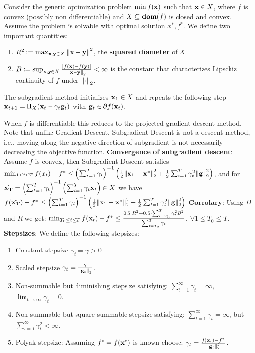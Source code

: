 Consider the generic optimization problem $\min f(\mathbf{x})$ such that $\mathbf{x} \in X$, where $f$ is convex (possibly non differentiable) and $X \subseteq \textbf{dom}(f)$ is closed and convex. Assume the problem is solvable with optimal solution $x^*, f^*$. We define two important quantities:
\begin{enumerate}[label=(\roman*), topsep=0pt,itemsep=0ex,partopsep=0ex,parsep=0ex]
    \itemsep0em
    \item $R^2 := \max_{\mathbf{x}, \mathbf{y} \in X}{\norm{\mathbf{x} - \mathbf{y}}^2}$, the \textbf{squared diameter} of $X$
    \item $B := \sup_{\mathbf{x}, \mathbf{y} \in X}{\frac{\abs{f(\mathbf{x}) - f(\mathbf{y})}}{\norm{\mathbf{x} - \mathbf{y}}_2}} < \infty$ is the constant that characterizes Lipschiz continuity of $f$ under $\norm{\cdot}_2$.
\end{enumerate}
\begin{framed}
    The subgradient method initializes $\mathbf{x}_1 \in X$ and repeats the following step $\mathbf{x}_{t+1}= \Pi_X(\mathbf{x}_t - \gamma_t \mathbf{g}_t)$ with $\mathbf{g}_t \in \partial f(\mathbf{x}_t)$.
\end{framed}
When $f$ is differentiable this reduces to the projected gradient descent method. Note that unlike Gradient Descent, Subgradient Descent is not a descent method, i.e., moving along the negative direction of subgradient is not necessarily decreasing the objective function.
\textbf{Convergence of subgradient descent}: Assume $f$ is convex, then Subgradient Descent satisfies $\min_{1 \leq t \leq T}{f(x_t) - f^*} \leq \left(\sum_{t=1}^T{\gamma_t}\right)^{-1}\left(\frac{1}{2}\norm{\mathbf{x}_1 - \mathbf{x}^*}_2^2 +\frac{1}{2}\sum_{t=1}^T{\gamma_t^2 \norm{\mathbf{g}}_2^2} \right)$, and for $\hat{\mathbf{x}_T} = \left(\sum_{t=1}^T{\gamma_t} \right)^{-1} \left(\sum_{t=1}^T \gamma_t \mathbf{x}_t \right) \in X$ we have $f(\hat{\mathbf{x}_T}) - f^* \leq \left(\sum_{t=1}^T{\gamma_t}\right)^{-1}\left(\frac{1}{2}\norm{\mathbf{x}_1 - \mathbf{x}^*}_2^2 +\frac{1}{2}\sum_{t=1}^T{\gamma_t^2 \norm{\mathbf{g}}_2^2} \right)$
\textbf{Corrolary}: Using $B$ and $R$ we get: $\min_{T_0 \leq t \leq T}{f(\mathbf{x}_t) - f^*} \leq \frac{0.5 \cdot R^2 + 0.5 \cdot \sum_{t=T_0}^T{\gamma_t^2 B^2}}{\sum_{t=T_0}^T{\gamma_t}}$, $\forall 1 \leq T_0 \leq T$. \\
\textbf{Stepsizes}: We define the following stepsizes:
\begin{enumerate}[label=(\roman*), topsep=0pt,itemsep=0ex,partopsep=0ex,parsep=0ex]    
    \itemsep0em
    \item Constant stepsize $\gamma_t = \gamma > 0$
    \item Scaled stepsize $\gamma_t = \frac{\gamma}{\norm{\mathbf{g}_t}_2}$.
    \item Non-summable but diminishing stepsize satisfying: $\sum_{t=1}^{\infty}{\gamma_t} = \infty$, $\lim_{t \rightarrow \infty}{\gamma_t} = 0$.
    \item Non-summable but square-summable stepsize satisfying: $\sum_{t=1}^{\infty}{\gamma_t} = \infty$, but $\sum_{t=1}^{\infty}{\gamma_t^2} < \infty$.
    \item Polyak stepsize: Assuming $f^* = f(\mathbf{x}^*)$ is known choose: $\gamma_t = \frac{f(\mathbf{x}_t) - f^*}{\norm{\mathbf{g}_t}_2^2}$.
\end{enumerate}
